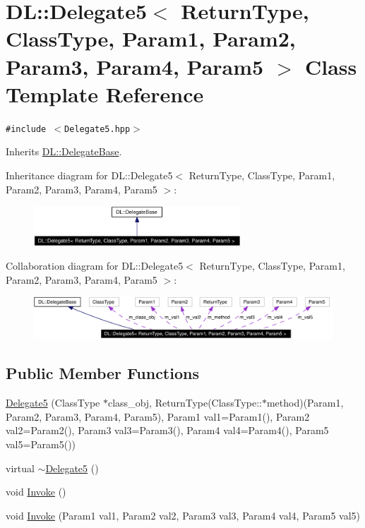\hypertarget{classDL_1_1Delegate5}{
\section{DL::Delegate5$<$ Return\-Type, Class\-Type, Param1, Param2, Param3, Param4, Param5 $>$ Class Template Reference}
\label{classDL_1_1Delegate5}
}
{\tt \#include $<$Delegate5.hpp$>$}

Inherits \hyperlink{classDL_1_1DelegateBase}{DL::Delegate\-Base}.

Inheritance diagram for DL::Delegate5$<$ Return\-Type, Class\-Type, Param1, Param2, Param3, Param4, Param5 $>$:\begin{figure}[H]
\begin{center}
\leavevmode
\includegraphics[width=219pt]{classDL_1_1Delegate5__inherit__graph}
\end{center}
\end{figure}
Collaboration diagram for DL::Delegate5$<$ Return\-Type, Class\-Type, Param1, Param2, Param3, Param4, Param5 $>$:\begin{figure}[H]
\begin{center}
\leavevmode
\includegraphics[width=334pt]{classDL_1_1Delegate5__coll__graph}
\end{center}
\end{figure}
\subsection*{Public Member Functions}
\begin{CompactItemize}
\item 
\hyperlink{classDL_1_1Delegate5_a0}{Delegate5} (Class\-Type $\ast$class\_\-obj, Return\-Type(Class\-Type::$\ast$method)(Param1, Param2, Param3, Param4, Param5), Param1 val1=Param1(), Param2 val2=Param2(), Param3 val3=Param3(), Param4 val4=Param4(), Param5 val5=Param5())
\item 
virtual \hyperlink{classDL_1_1Delegate5_a1}{$\sim$Delegate5} ()
\item 
void \hyperlink{classDL_1_1Delegate5_a2}{Invoke} ()
\item 
void \hyperlink{classDL_1_1Delegate5_a3}{Invoke} (Param1 val1, Param2 val2, Param3 val3, Param4 val4, Param5 val5)
\end{CompactItemize}

